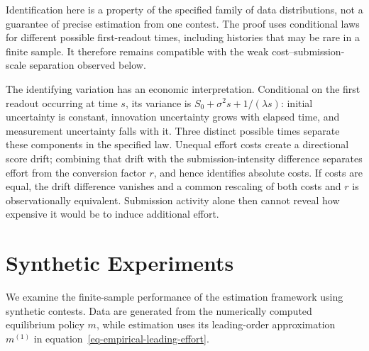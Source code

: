 \documentclass[mnsc]{informs3}
\begin{document}
\begingroup
Identification here is a property of the specified family of data distributions, not a guarantee of precise estimation from one contest. The proof uses conditional laws for different possible first-readout times, including histories that may be rare in a finite sample. It therefore remains compatible with the weak cost--submission-scale separation observed below.

The identifying variation has an economic interpretation. Conditional on the first readout occurring at time $s$, its variance is $S_0+\sigma^2s+1/(\lambda s)$: initial uncertainty is constant, innovation uncertainty grows with elapsed time, and measurement uncertainty falls with it. Three distinct possible times separate these components in the specified law. Unequal effort costs create a directional score drift; combining that drift with the submission-intensity difference separates effort from the conversion factor $r$, and hence identifies absolute costs. If costs are equal, the drift difference vanishes and a common rescaling of both costs and $r$ is observationally equivalent. Submission activity alone then cannot reveal how expensive it would be to induce additional effort.
\par\endgroup

\section{Synthetic Experiments}\label{sect-synthetic}

{We examine the finite-sample performance of the estimation framework using synthetic contests. Data are generated from the numerically computed equilibrium policy $m$, while estimation uses its leading-order approximation $m^{(1)}$ in equation~\eqref{eq-empirical-leading-effort}.}
\end{document}
